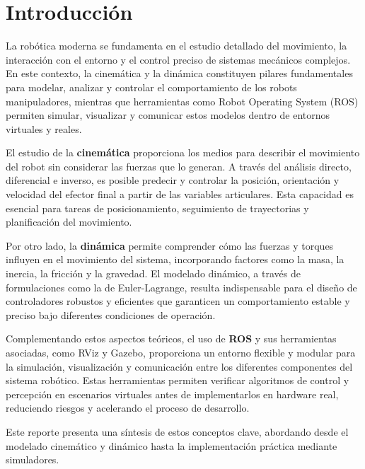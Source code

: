 \chapter{Introducción} \label{chap:introduccion}

La robótica moderna se fundamenta en el estudio detallado del movimiento, la interacción con el entorno y el control preciso de sistemas mecánicos complejos. En este contexto, la cinemática y la dinámica constituyen pilares fundamentales para modelar, analizar y controlar el comportamiento de los robots manipuladores, mientras que herramientas como Robot Operating System (ROS) permiten simular, visualizar y comunicar estos modelos dentro de entornos virtuales y reales.

El estudio de la \textbf{cinemática} proporciona los medios para describir el movimiento del robot sin considerar las fuerzas que lo generan. A través del análisis directo, diferencial e inverso, es posible predecir y controlar la posición, orientación y velocidad del efector final a partir de las variables articulares. Esta capacidad es esencial para tareas de posicionamiento, seguimiento de trayectorias y planificación del movimiento.

Por otro lado, la \textbf{dinámica} permite comprender cómo las fuerzas y torques influyen en el movimiento del sistema, incorporando factores como la masa, la inercia, la fricción y la gravedad. El modelado dinámico, a través de formulaciones como la de Euler-Lagrange, resulta indispensable para el diseño de controladores robustos y eficientes que garanticen un comportamiento estable y preciso bajo diferentes condiciones de operación.

Complementando estos aspectos teóricos, el uso de \textbf{ROS} y sus herramientas asociadas, como RViz y Gazebo, proporciona un entorno flexible y modular para la simulación, visualización y comunicación entre los diferentes componentes del sistema robótico. Estas herramientas permiten verificar algoritmos de control y percepción en escenarios virtuales antes de implementarlos en hardware real, reduciendo riesgos y acelerando el proceso de desarrollo.

Este reporte presenta una síntesis de estos conceptos clave, abordando desde el modelado cinemático y dinámico hasta la implementación práctica mediante simuladores.